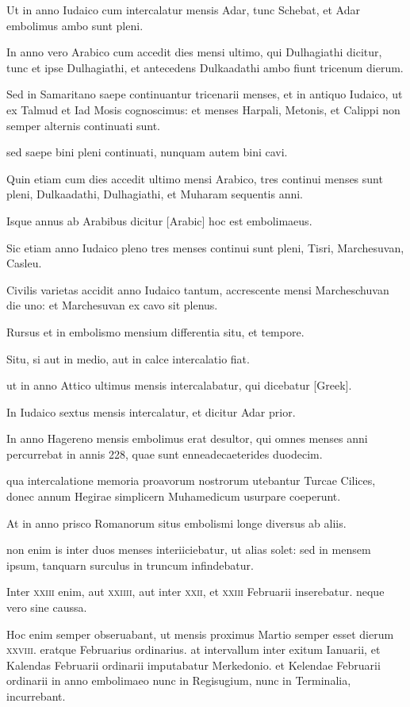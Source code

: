 Ut in anno Iudaico cum intercalatur mensis Adar, tunc
Schebat, et Adar embolimus ambo sunt pleni.

In anno vero Arabico
cum accedit dies mensi ultimo, qui Dulhagiathi dicitur, tunc et ipse
Dulhagiathi, et antecedens Dulkaadathi ambo fiunt tricenum dierum.

Sed in Samaritano saepe continuantur tricenarii menses, et in antiquo
Iudaico, ut ex Talmud et Iad Mosis cognoscimus: et menses Harpali,
Metonis, et Calippi non semper alternis continuati sunt.

sed saepe bini
pleni continuati, nunquam autem bini cavi.

Quin etiam cum dies accedit
ultimo mensi Arabico, tres continui menses sunt pleni, Dulkaadathi,
Dulhagiathi, et Muharam sequentis anni.

Isque annus ab Arabibus
dicitur \textarabic{[Arabic]} hoc est embolimaeus.

Sic etiam anno Iudaico pleno
tres menses continui sunt pleni, Tisri, Marchesuvan, Casleu.

Civilis
varietas accidit anno Iudaico tantum, accrescente mensi Marcheschuvan
die uno: et Marchesuvan ex cavo sit plenus.

Rursus et in embolismo
mensium differentia situ, et tempore.

Situ, si aut in medio, aut in calce
intercalatio fiat.

ut in anno Attico ultimus mensis intercalabatur, qui
dicebatur \textgreek{[Greek]}.

In Iudaico sextus mensis intercalatur, et
dicitur Adar prior.

In anno Hagereno mensis embolimus erat desultor,
qui omnes menses anni percurrebat in annis 228, quae sunt enneadecaeterides
duodecim.

qua intercalatione memoria proavorum nostrorum
utebantur Turcae Cilices, donec annum Hegirae simplicern
Muhamedicum usurpare coeperunt.

At in anno prisco Romanorum
situs embolismi longe diversus ab aliis.

non enim is inter duos
menses interiiciebatur, ut alias solet: sed in mensem ipsum, tanquarn
surculus in truncum infindebatur.

Inter \textsc{xxiii} enim, aut \textsc{xxiiii},
aut inter \textsc{xxii}, et \textsc{xxiii} Februarii inserebatur.
neque vero sine caussa.

Hoc enim semper obseruabant, ut mensis proximus Martio semper esset
dierum \textsc{xxviii}.
eratque Februarius ordinarius. at intervallum inter exitum
Ianuarii, et Kalendas Februarii ordinarii imputabatur Merkedonio.
et Kelendae Februarii ordinarii in anno embolimaeo nunc in Regisugium,
nunc in Terminalia, incurrebant.

